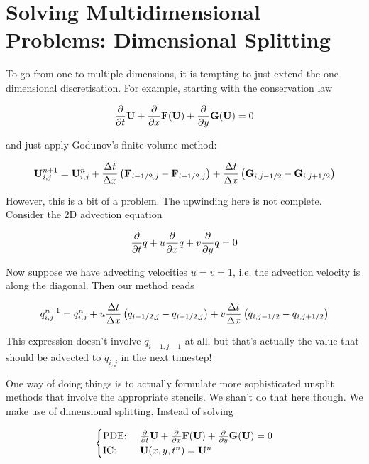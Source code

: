 \newpage
\section{Solving Multidimensional Problems: Dimensional Splitting}\label{chap:dimensional-splitting}


To go from one to multiple dimensions, it is tempting to just extend the one dimensional discretisation.
For example, starting with the conservation law

\begin{equation}
	\frac{\partial}{\partial t}{\mathbf{U}} + \frac{\partial}{\partial x}{\mathbf{F}(\mathbf{U})} + \frac{\partial}{\partial y} \mathbf{G}(\mathbf{U}) = 0
\end{equation}


and just apply Godunov's finite volume method:

\begin{equation}
	\mathbf{U}_{i,j}^{n+1} = 
					\mathbf{U}_{i,j}^n 
					+ \frac{\Delta t}{\Delta x} \left( \mathbf{F}_{i - 1/2, j} - \mathbf{F}_{i + 1/2, j}\right) 
					+ \frac{\Delta t}{\Delta x} \left( \mathbf{G}_{i ,j - 1/2} - \mathbf{G}_{i, j + 1/2}\right) 
\end{equation}


However, this is a bit of a problem.
The upwinding here is not complete.
Consider the 2D advection equation

\begin{equation}
	\frac{\partial}{\partial t}{q} + u\frac{\partial}{\partial x}{q} + v \frac{\partial}{\partial y} q = 0
\end{equation}

Now suppose we have advecting velocities $u = v = 1$, i.e. the advection velocity is along the diagonal.
Then our method reads 

\begin{equation}
	q_{i,j}^{n+1} = 
					q_{i,j}^n 
					+ u \frac{\Delta t}{\Delta x} \left( q_{i - 1/2, j} - q_{i + 1/2, j}\right) 
					+ v \frac{\Delta t}{\Delta x} \left( q_{i ,j - 1/2} - q_{i, j + 1/2}\right) 
\end{equation}

This expression doesn't involve $q_{i-1, j-1}$ at all, but that's actually the value that should be advected to $q_{i, j}$ in the next timestep!


One way of doing things is to actually formulate more sophisticated unsplit methods that involve the appropriate stencils.
We shan't do that here though.
We make use of dimensional splitting. 
Instead of solving

\begin{equation}
	\begin{cases}
		\text{PDE: } & \frac{\partial}{\partial t}{\mathbf{U}} + \frac{\partial}{\partial x}{\mathbf{F}(\mathbf{U})} + \frac{\partial}{\partial y} \mathbf{G}(\mathbf{U}) = 0\\
		\text{IC: } & \mathbf{U}(x, y, t^n) = \mathbf{U}^n
	\end{cases}
\end{equation}

